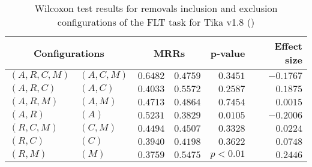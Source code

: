 
\begin{table}
\begin{spacing}{1.2}
\centering
\caption{Wilcoxon test results for removals inclusion and exclusion configurations of the FLT task for Tika v1.8 (\ctwo)}
\label{table:versus-wilcox-tika-flt-removals}
\begin{tabular}{ll|rr|rr}
\toprule
      \multicolumn{2}{c|}{Configurations} &                \multicolumn{2}{c|}{MRRs} &             p-value & Effect size \\
\midrule
 $(A,R,C,M)$ &  $(A,C,M)$ &  $\bm{0.6482}$ &       $0.4759$ & $0.3451$ &   $-0.1767$ \\
   $(A,R,C)$ &    $(A,C)$ &       $0.4033$ &  $\bm{0.5572}$ & $0.2587$ &    $0.1875$ \\
   $(A,R,M)$ &    $(A,M)$ &       $0.4713$ &  $\bm{0.4864}$ & $0.7454$ &    $0.0015$ \\
     $(A,R)$ &      $(A)$ &  $\bm{0.5231}$ &       $0.3829$ & $0.0105$ &   $-0.2006$ \\
   $(R,C,M)$ &    $(C,M)$ &       $0.4494$ &  $\bm{0.4507}$ & $0.3328$ &    $0.0224$ \\
     $(R,C)$ &      $(C)$ &       $0.3940$ &  $\bm{0.4198}$ & $0.3622$ &    $0.0748$ \\
     $(R,M)$ &      $(M)$ &       $0.3759$ &  $\bm{0.5475}$ & $p<0.01$ &    $0.2446$ \\
\bottomrule
\end{tabular}

\end{spacing}
\end{table}

